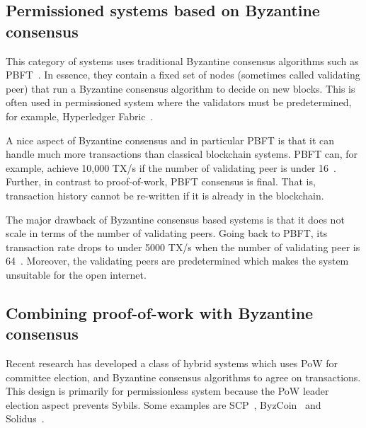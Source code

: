 \subsection{Permissioned systems based on Byzantine consensus}

This category of systems uses traditional Byzantine consensus algorithms such as PBFT~\cite{castro1999practical}.
In essence, they contain a fixed set of nodes (sometimes called validating peer) that run a Byzantine consensus algorithm to decide on new blocks.
This is often used in permissioned system where the validators must be predetermined,
for example, Hyperledger Fabric~\cite{cachin2016architecture}.

A nice aspect of Byzantine consensus and in particular PBFT is that it can handle much more transactions than classical blockchain systems.
PBFT can, for example, achieve 10,000 TX/s if the number of validating peer is under 16~\cite[Section 5.2]{miller2016honey}.
Further, in contrast to proof-of-work, PBFT consensus is final.
That is, transaction history cannot be re-written if it is already in the blockchain.

The major drawback of Byzantine consensus based systems is that it does not scale in terms of the number of validating peers.
Going back to PBFT, its transaction rate drops to under 5000 TX/s when the number of validating peer is 64~\cite[Section 5.2]{miller2016honey}.
Moreover, the validating peers are predetermined which makes the system unsuitable for the open internet.



\subsection{Combining proof-of-work with Byzantine consensus}
Recent research has developed a class of hybrid systems which uses PoW for committee election,
and Byzantine consensus algorithms to agree on transactions.
This design is primarily for permissionless system because the PoW leader election aspect prevents Sybils.
Some examples are SCP~\cite{luu2015scp}, ByzCoin~\cite{kogias2016enhancing} and Solidus~\cite{abraham2016solidus}.

